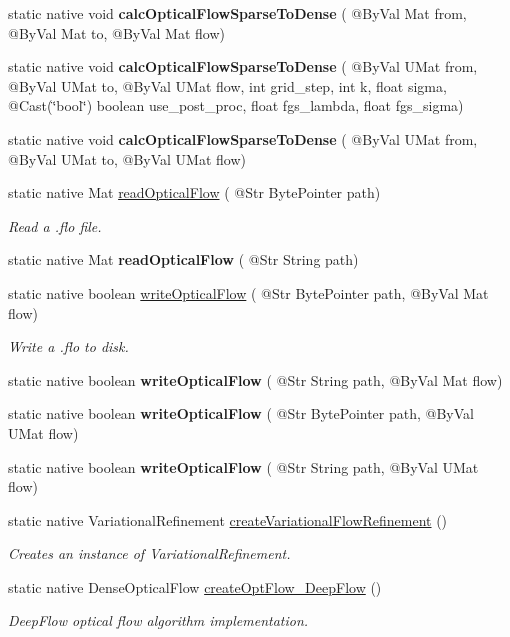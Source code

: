 \begin{DoxyCompactItemize}
static native void {\bfseries calc\+Optical\+Flow\+Sparse\+To\+Dense} ( @By\+Val Mat from, @By\+Val Mat to, @By\+Val Mat flow)
\item 
static native void {\bfseries calc\+Optical\+Flow\+Sparse\+To\+Dense} ( @By\+Val U\+Mat from, @By\+Val U\+Mat to, @By\+Val U\+Mat flow, int grid\+\_\+step, int k, float sigma, @Cast(\char`\"{}bool\char`\"{}) boolean use\+\_\+post\+\_\+proc, float fgs\+\_\+lambda, float fgs\+\_\+sigma)
\item 
static native void {\bfseries calc\+Optical\+Flow\+Sparse\+To\+Dense} ( @By\+Val U\+Mat from, @By\+Val U\+Mat to, @By\+Val U\+Mat flow)
\item 
static native Mat \hyperlink{group__optflow_ga8adc9b054c1518ab41c20d8ada51b9b7}{read\+Optical\+Flow} ( @Str Byte\+Pointer path)
\begin{DoxyCompactList}\small\item\em Read a .flo file. \end{DoxyCompactList}\item 
static native Mat {\bfseries read\+Optical\+Flow} ( @Str String path)
\item 
static native boolean \hyperlink{group__optflow_ga41bea8c25211f346782adfb40129e96e}{write\+Optical\+Flow} ( @Str Byte\+Pointer path, @By\+Val Mat flow)
\begin{DoxyCompactList}\small\item\em Write a .flo to disk. \end{DoxyCompactList}\item 
static native boolean {\bfseries write\+Optical\+Flow} ( @Str String path, @By\+Val Mat flow)
\item 
static native boolean {\bfseries write\+Optical\+Flow} ( @Str Byte\+Pointer path, @By\+Val U\+Mat flow)
\item 
static native boolean {\bfseries write\+Optical\+Flow} ( @Str String path, @By\+Val U\+Mat flow)
\item 
static native Variational\+Refinement \hyperlink{group__optflow_ga6d7be52a57f2105050c7a7039ab1af2e}{create\+Variational\+Flow\+Refinement} ()
\begin{DoxyCompactList}\small\item\em Creates an instance of Variational\+Refinement. \end{DoxyCompactList}\item 
static native Dense\+Optical\+Flow \hyperlink{group__optflow_ga27f2a261b7f69f4eaaf2aa2552943a1a}{create\+Opt\+Flow\+\_\+\+Deep\+Flow} ()
\begin{DoxyCompactList}\small\item\em Deep\+Flow optical flow algorithm implementation. \end{DoxyCompactList}\item 

\end{DoxyCompactItemize}
